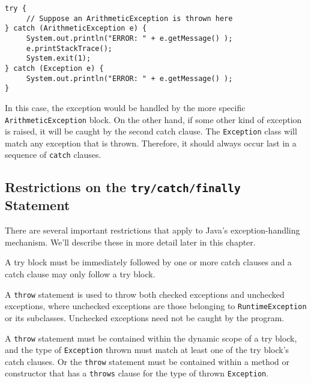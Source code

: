 \begin{jjjlisting}
\begin{lstlisting}
try {
     // Suppose an ArithmeticException is thrown here
} catch (ArithmeticException e) {
     System.out.println("ERROR: " + e.getMessage() );
     e.printStackTrace();
     System.exit(1);
} catch (Exception e) {
     System.out.println("ERROR: " + e.getMessage() );
}
\end{lstlisting}
\end{jjjlisting}

\noindent In this case, the exception would be handled by the more
specific {\tt Arithmetic\-Excep\-tion} block.  On the other hand, if some
other kind of exception is raised, it will be caught by the second
catch clause.   The {\tt Exception} class will match any exception that is
thrown.  Therefore, it should always occur last in a sequence of
{\tt catch} clauses.


\subsection{Restrictions on the {\tt try/catch/finally} \\Statement}
\noindent There are several important restrictions that apply to Java's
exception-handling mechanism.  We'll describe these in more detail
later in this chapter.

\begin{BL}
\item  A try block must be immediately followed by one or more
catch clauses and a catch clause may only follow a try block.

\item  A {\tt throw} statement is used to
throw both  checked exceptions and  unchecked exceptions, where
unchecked exceptions are those belonging to {\tt Runtime\-Ex\-cep\-tion} or
its subclasses. Unchecked exceptions need not
be caught by the program.

\item  A {\tt throw} statement must be contained within
the dynamic scope of a try block, and the type of {\tt Exception}
thrown must match at least one of the try block's catch clauses.  Or the
{\tt throw} statement must be contained within a method or constructor
that has a {\tt throws} clause for the type of thrown {\tt Exception}.
\end{BL}

